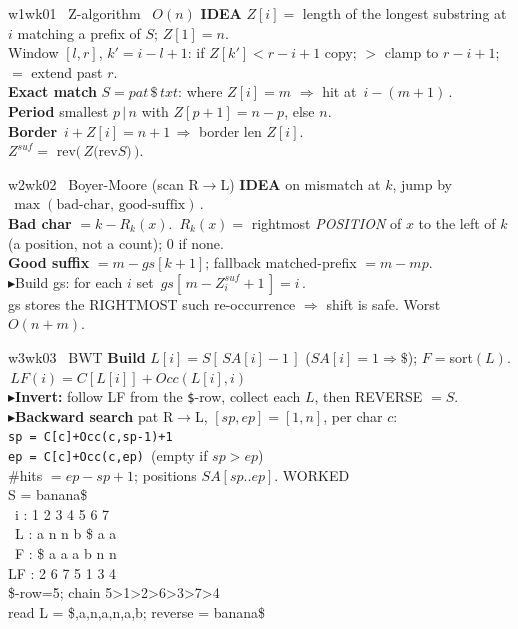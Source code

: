\documentclass[9pt]{extarticle}
\newcommand{\To}{\ensuremath{\Rightarrow}}
\newcommand{\C}[1]{\texttt{#1}}
\newcommand{\key}[1]{\colorbox{hl}{\ensuremath{\,#1\,}}}     %
\newcommand{\T}[1]{\textbf{#1}\;}                            %
\newcommand{\R}{\textcolor{red!75!black}{$\blacktriangleright$}\;}  %
\newcommand{\ex}{\textcolor{black!55}{\scriptsize\textsf{WORKED}}\\[1pt]} %
\begin{document}
\vspace{-2pt}
\begin{multicols}{3}

\begin{wk}{w1}{wk01 \ Z-algorithm \ $O(n)$}
\T{IDEA} $Z[i]=$ length of the longest substring at $i$ matching a prefix of $S$; $Z[1]=n$.\\[1pt]
Window $[l,r]$, $k'{=}i{-}l{+}1$: if $Z[k']{<}r{-}i{+}1$ copy; ${>}$ clamp to $r{-}i{+}1$; ${=}$ extend past $r$.\\[1pt]
\T{Exact match} $S{=}pat\,\C{\$}\,txt$: where $Z[i]{=}m$ \To{} hit at \key{i-(m{+}1)}.\\
\T{Period} smallest $p\,|\,n$ with $Z[p{+}1]{=}n{-}p$, else $n$.\\
\T{Border} \key{i+Z[i]=n{+}1}\To{} border len $Z[i]$.\\
$Z^{suf}=$ rev$(\,Z($rev$ S)\,)$.
\end{wk}

\begin{wk}{w2}{wk02 \ Boyer-Moore (scan R$\to$L)}
\T{IDEA} on mismatch at $k$, jump by \key{\max(\text{bad-char},\,\text{good-suffix})}.\\[1pt]
\textbf{Bad char} $=k-R_k(x)$.\ $R_k(x)=$ rightmost \emph{POSITION} of $x$ to the left of $k$ (a position, not a count); $0$ if none.\\[1pt]
\textbf{Good suffix} $=m-gs[k{+}1]$; fallback matched-prefix $=m-mp$.\\
\R Build gs: for each $i$ set \key{gs[\,m-Z^{suf}_i+1\,]=i}.\\
gs stores the RIGHTMOST such re-occurrence $\To$ shift is safe. Worst $O(n{+}m)$.
\end{wk}

\begin{wk}{w3}{wk03 \ BWT}
\T{Build} $L[i]=S[\,SA[i]-1\,]$ ($SA[i]{=}1\To\C{\$}$); $F=$sort$(L)$.\\[1pt]
\key{LF(i)=C[L[i]]+Occ(L[i],i)}\\[1pt]
\R \textbf{Invert:} follow LF from the \C{\$}-row, collect each $L$, then REVERSE $=S$.\\
\R \textbf{Backward search} pat R$\to$L, $[sp,ep]{=}[1,n]$, per char $c$:\\
\hspace*{0.5em}\C{sp = C[c]+Occ(c,sp-1)+1}\\
\hspace*{0.5em}\C{ep = C[c]+Occ(c,ep)}\ (empty if $sp{>}ep$)\\
\#hits $=ep{-}sp{+}1$; positions $SA[sp..ep]$.
\tcblower
\ex
\ttfamily
S = banana\$\\
\ i : 1 2 3 4 5 6 7\\
\ L : a n n b \$ a a\\
\ F : \$ a a a b n n\\
LF : 2 6 7 5 1 3 4\\
\$-row=5; chain 5{>}1{>}2{>}6{>}3{>}7{>}4\\
read L = \$,a,n,a,n,a,b; reverse = banana\$
\end{wk}


\end{multicols}
\end{document}
